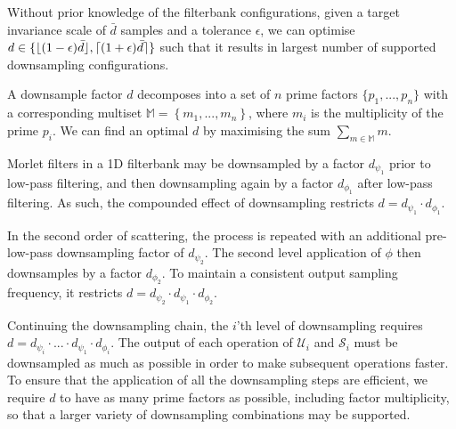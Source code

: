 Without prior knowledge of the filterbank configurations, given a target invariance scale of $\bar{d}$ samples and a tolerance $\epsilon$, we can optimise $d \in \{\lfloor(1 - \epsilon)\bar{d}\rfloor, \lceil(1 + \epsilon)\bar{d}\rceil\}$ such that it results in largest number of supported downsampling configurations.

A downsample factor $d$ decomposes into a set of $n$ prime factors $\{p_1, ..., p_n\}$ with a corresponding multiset $\mathbb{M} = \left\{ m_1, ..., m_n \right\}$, where $m_i$ is the multiplicity of the prime $p_i$. We can find an optimal $d$ by maximising the sum $\sum\limits_{m \in \mathbb{M}} m$.


Morlet filters in a 1D filterbank may be downsampled by a factor $d_{\psi_1}$ prior to low-pass filtering, and then downsampling again by a factor $d_{\phi_1}$ after low-pass filtering. As such, the compounded effect of downsampling restricts $d = d_{\psi_1} \cdot d_{\phi_1}$.

In the second order of scattering, the process is repeated with an additional pre-low-pass downsampling factor of $d_{\psi_2}$. The second level application of $\phi$ then downsamples by a factor $d_{\phi_2}$. To maintain a consistent output sampling frequency, it restricts $d = d_{\psi_2} \cdot d_{\psi_1} \cdot d_{\phi_2}$. 

Continuing the downsampling chain, the $i$'th level of downsampling requires $d = d_{\psi_i} \cdot ... \cdot d_{\psi_1} \cdot d_{\phi_i}$. The output of each operation of $\mathcal{U}_i$ and $\mathcal{S}_i$ must be downsampled as much as possible in order to make subsequent operations faster. To ensure that the application of all the downsampling steps are efficient, we require $d$ to have as many prime factors as possible, including factor multiplicity, so that a larger variety of downsampling combinations may be supported.





